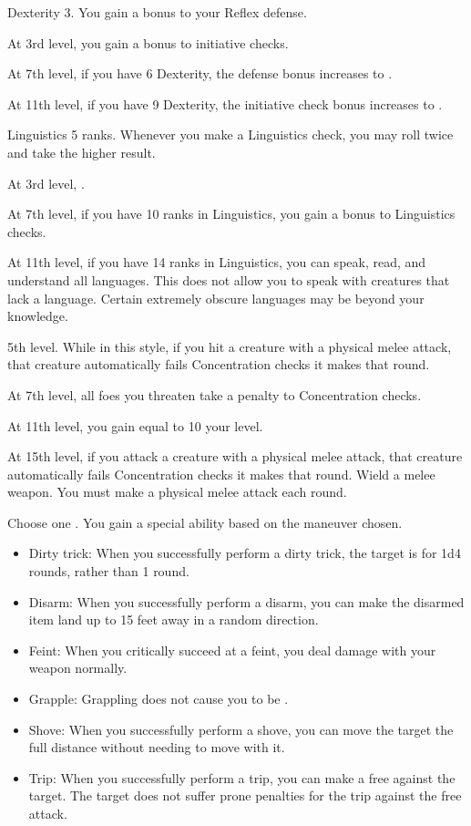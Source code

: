     \featpre Dexterity 3.
    \featben You gain a  bonus to your Reflex defense.

    At 3rd level, you gain a  bonus to initiative checks.

    At 7th level, if you have 6 Dexterity, the defense bonus increases to .

    At 11th level, if you have 9 Dexterity, the initiative check bonus increases to .

    \featpre Linguistics 5 ranks.
    \featben Whenever you make a Linguistics check, you may roll twice and take the higher result.

    At 3rd level, \tdash.

    At 7th level, if you have 10 ranks in Linguistics, you gain a  bonus to Linguistics checks.

    At 11th level, if you have 14 ranks in Linguistics, you can speak, read, and understand all languages.
    This does not allow you to speak with creatures that lack a language.
    Certain extremely obscure languages may be beyond your knowledge.

    \featpre 5th level.
    \featben While in this style, if you hit a creature with a physical melee attack, that creature automatically fails Concentration checks it makes that round.

    At 7th level, all foes you threaten take a  penalty to Concentration checks.

    At 11th level, you gain  equal to 10 \add your level.

    At 15th level, if you attack a creature with a physical melee attack, that creature automatically fails Concentration checks it makes that round.
    \stylereq Wield a melee weapon. You must make a physical melee attack each round.

    Choose one .
    \featben You gain a special ability based on the maneuver chosen.
    \begin{itemize}
        \item Dirty trick: When you successfully perform a dirty trick, the target is \impaired for 1d4 rounds, rather than 1 round.
        \item Disarm: When you successfully perform a disarm, you can make the disarmed item land up to 15 feet away in a random direction.
        \item Feint: When you critically succeed at a feint, you deal damage with your weapon normally.
        \item Grapple: Grappling does not cause you to be .
        \item Shove: When you successfully perform a shove, you can move the target the full distance without needing to move with it.
        \item Trip: When you successfully perform a trip, you can make a free  against the target. The target does not suffer prone penalties for the trip against the free attack.
    \end{itemize}

